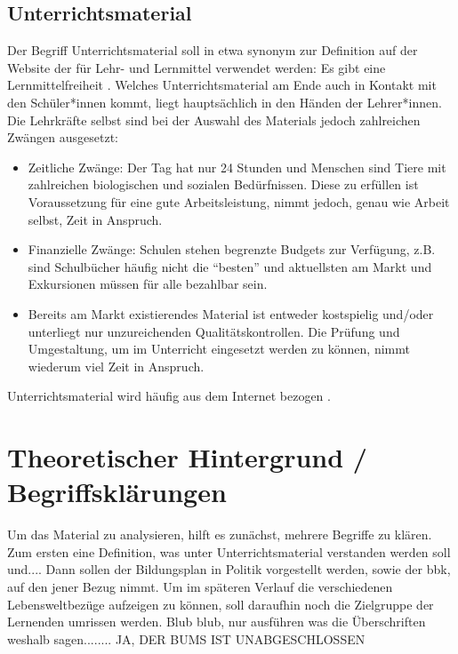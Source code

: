 \subsection{Unterrichtsmaterial}
Der Begriff Unterrichtsmaterial soll in etwa synonym zur Definition auf der Website der \textcite{KMKMittel} für Lehr- und Lernmittel verwendet werden: 
Es gibt eine Lernmittelfreiheit \autocite[]{KMKMittel}.
Welches Unterrichtsmaterial am Ende auch in Kontakt mit den Schüler*innen kommt, liegt hauptsächlich in den Händen der Lehrer*innen.
Die Lehrkräfte selbst sind bei der Auswahl des Materials jedoch zahlreichen Zwängen ausgesetzt:
\begin{itemize}
    \item Zeitliche Zwänge: Der Tag hat nur 24 Stunden und Menschen sind Tiere mit zahlreichen biologischen und sozialen Bedürfnissen. Diese zu erfüllen ist Voraussetzung für eine gute Arbeitsleistung, nimmt jedoch, genau wie Arbeit selbst, Zeit in Anspruch. 
    \item Finanzielle Zwänge: Schulen stehen begrenzte Budgets zur Verfügung, z.B. sind Schulbücher häufig nicht die \enquote{besten} und aktuellsten am Markt und Exkursionen müssen für alle bezahlbar sein. 
    \item Bereits am Markt existierendes Material ist entweder kostspielig und/oder unterliegt nur unzureichenden Qualitätskontrollen. Die Prüfung und Umgestaltung, um im Unterricht eingesetzt werden zu können, nimmt wiederum viel Zeit in Anspruch. 
\end{itemize}

Unterrichtsmaterial wird häufig aus dem Internet bezogen \autocite[82]{Neumann2015}. %


\section{Theoretischer Hintergrund / Begriffsklärungen}
Um das Material zu analysieren, hilft es zunächst, mehrere Begriffe zu klären. Zum ersten eine Definition, was unter Unterrichtsmaterial verstanden werden soll und.... %
Dann sollen der Bildungsplan in Politik vorgestellt werden, sowie der \gls{bbk}, auf den jener Bezug nimmt. Um im späteren Verlauf die verschiedenen Lebensweltbezüge aufzeigen zu können, soll daraufhin noch die Zielgruppe der Lernenden umrissen werden. 
Blub blub, nur ausführen was die Überschriften weshalb sagen........
JA, DER BUMS IST UNABGESCHLOSSEN



